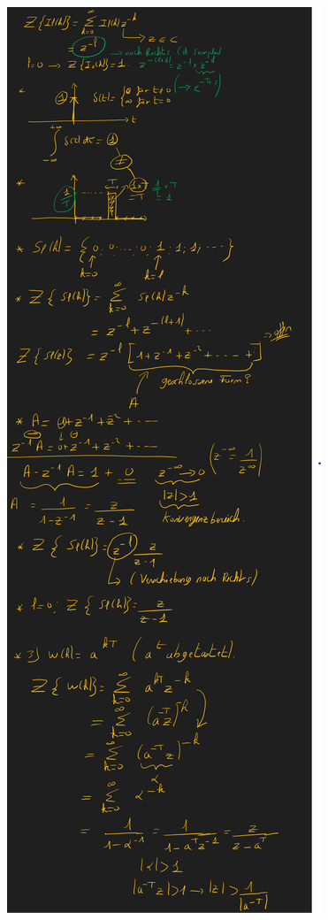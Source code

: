 \documentclass[
  10pt,
  a4paper,
  onecolumn]{article}
\numberwithin{equation}{section}
\begin{document}
\begin{figure}[H]

{\centering \includegraphics{images/IAS/Z-Transformation.png}

}

\end{figure}
\end{document}
